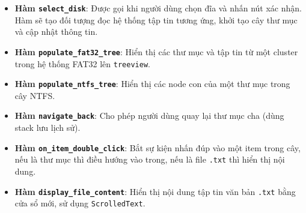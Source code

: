 \begin{itemize}
    \item \textbf{Hàm \texttt{select\_disk}}: Được gọi khi người dùng chọn đĩa và nhấn nút xác nhận. Hàm sẽ tạo đối tượng đọc hệ thống tập tin tương ứng, khởi tạo cây thư mục và cập nhật thông tin.

    \item \textbf{Hàm \texttt{populate\_fat32\_tree}}: Hiển thị các thư mục và tập tin từ một cluster trong hệ thống FAT32 lên \texttt{treeview}.

    \item \textbf{Hàm \texttt{populate\_ntfs\_tree}}: Hiển thị các node con của một thư mục trong cây NTFS.

    \item \textbf{Hàm \texttt{navigate\_back}}: Cho phép người dùng quay lại thư mục cha (dùng stack lưu lịch sử).

    \item \textbf{Hàm \texttt{on\_item\_double\_click}}: Bắt sự kiện nhấn đúp vào một item trong cây, nếu là thư mục thì điều hướng vào trong, nếu là file \texttt{.txt} thì hiển thị nội dung.

    \item \textbf{Hàm \texttt{display\_file\_content}}: Hiển thị nội dung tập tin văn bản \texttt{.txt} bằng cửa sổ mới, sử dụng \texttt{ScrolledText}.
\end{itemize}
